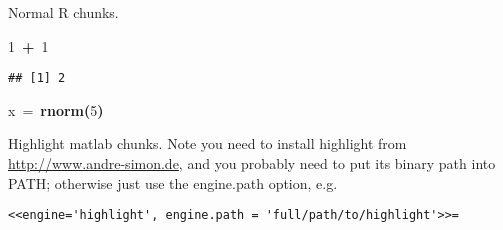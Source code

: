 \documentclass{article}\usepackage{graphicx, color}
\makeatletter
\newcommand{\hlnumber}[1]{\textcolor[rgb]{0.501960784313725,0,0.501960784313725}{#1}}%
\newcommand{\hlfunctioncall}[1]{\textcolor[rgb]{0,0.501960784313725,0.752941176470588}{\textbf{#1}}}%
\newcommand{\hlkeyword}[1]{\textcolor[rgb]{0.733333333333333,0.474509803921569,0.466666666666667}{\textbf{#1}}}%
\newcommand{\hlassignement}[1]{\textcolor[rgb]{0,0,0}{#1}}%
\newcommand{\hlsymbol}[1]{\textcolor[rgb]{1,0,0.501960784313725}{#1}}%
\newenvironment{kframe}{%
 \def\at@end@of@kframe{}%
 \ifinner\ifhmode%
  \def\at@end@of@kframe{\end{minipage}}%
  \begin{minipage}{\columnwidth}%
 \fi\fi%
 \def\FrameCommand##1{\hskip\@totalleftmargin \hskip-\fboxsep
 \colorbox{shadecolor}{##1}\hskip-\fboxsep
     \hskip-\linewidth \hskip-\@totalleftmargin \hskip\columnwidth}%
 \MakeFramed {\advance\hsize-\width
   \@totalleftmargin\z@ \linewidth\hsize
   \@setminipage}}%
 {\par\unskip\endMakeFramed%
 \at@end@of@kframe}
\newenvironment{knitrout}{}{} %
\makeatother
\begin{document}
Normal R chunks.

\begin{knitrout}
\color{fgcolor}\begin{kframe}
\begin{flushleft}
\ttfamily\noindent
\hlnumber{1}{\ }\hlkeyword{+}{\ }\hlnumber{1}\mbox{}
\normalfont
\end{flushleft}
\begin{verbatim}
## [1] 2
\end{verbatim}
\begin{flushleft}
\ttfamily\noindent
\hlsymbol{x}{\ }\hlassignement{=}{\ }\hlfunctioncall{rnorm}\hlkeyword{(}\hlnumber{5}\hlkeyword{)}\mbox{}
\normalfont
\end{flushleft}
\end{kframe}
\end{knitrout}


Highlight matlab chunks. Note you need to install highlight from \url{http://www.andre-simon.de}, and you probably need to put its binary path into PATH; otherwise just use the engine.path option, e.g.

\noindent\verb|<<engine='highlight', engine.path = 'full/path/to/highlight'>>=|
\end{document}
